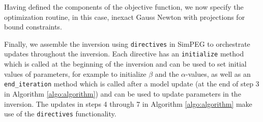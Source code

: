 




Having defined the components of the objective function, we now specify the optimization routine, in this case, inexact Gauss Newton with projections for bound constraints.




Finally, we assemble the inversion using \texttt{directives} in SimPEG to orchestrate updates throughout the inversion. Each directive has an \texttt{initialize} method which is called at the beginning of the inversion and can be used to set initial values of parameters, for example to initialize $\beta$ and the $\alpha$-values, as well as an \texttt{end\_iteration} method which is called after a model update (at the end of step 3 in Algorithm \ref{algo:algorithm}) and can be used to update parameters in the inversion. The updates in steps 4 through 7 in Algorithm \ref{algo:algorithm} make use of the \texttt{directives} functionality.


